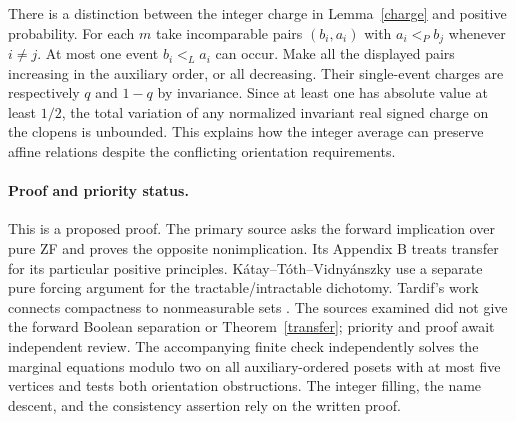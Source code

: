\documentclass[11pt]{article}
\begin{document}
There is a distinction between the integer charge in Lemma~\ref{charge} and positive probability. For each $m$ take incomparable pairs $(b_i,a_i)$ with $a_i<_P b_j$ whenever $i\ne j$. At most one event $b_i<_L a_i$ can occur. Make all the displayed pairs increasing in the auxiliary order, or all decreasing. Their single-event charges are respectively $q$ and $1-q$ by invariance. Since at least one has absolute value at least $1/2$, the total variation of any normalized invariant real signed charge on the clopens is unbounded. This explains how the integer average can preserve affine relations despite the conflicting orientation requirements.

\paragraph{Proof and priority status.}
This is a proposed proof. The primary source asks the forward implication over pure ZF and proves the opposite nonimplication. Its Appendix B treats transfer for its particular positive principles. K\'atay--T\'oth--Vidny\'anszky use a separate pure forcing argument for the tractable/intractable dichotomy. Tardif's work connects compactness to nonmeasurable sets \cite{tardif}. The sources examined did not give the forward Boolean separation or Theorem~\ref{transfer}; priority and proof await independent review. The accompanying finite check independently solves the marginal equations modulo two on all auxiliary-ordered posets with at most five vertices and tests both orientation obstructions. The integer filling, the name descent, and the consistency assertion rely on the written proof.
\end{document}
